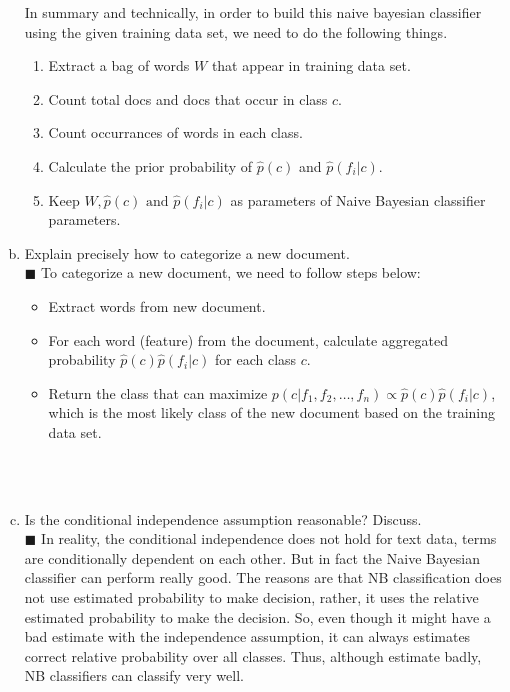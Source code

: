 \documentclass{article}
\newcommand{\solution}[1]{~\\ $\blacksquare$ \sffamily\upshape\selectfont #1
\normalfont ~\\~ }
\begin{document}
\begin{enumerate}[a.]
{    In summary and technically, in order to build this naive bayesian
    classifier using the given training data set, we need to do the
    following things.  \\ 
    \begin{enumerate}
    \item Extract a bag of words $W$ that appear in training data set. 
    \item Count total docs and docs that occur in class $c$. 
    \item Count occurrances of words in each class. 
    \item Calculate the prior probability of $\hat{p}(c)$ and
      $\hat{p}(f_i|c)$. 
    \item Keep $W, \hat{p}(c) \mbox{ and } \hat{p}(f_i|c)$ as
      parameters of Naive Bayesian classifier parameters. 
     \end{enumerate}
  }
\item Explain precisely how to categorize a new document. 
  \solution{To categorize a new document, we need to follow steps
    below: \\ 
  \begin{itemize}
    \item Extract words from new document. 
    \item For each word (feature) from the document, calculate
      aggregated probability $\hat{p}(c)\hat{p}(f_i|c)$ for each class
      $c$. 
    \item Return the class that can maximize $p(c|f_1,f_2,\ldots,f_n)
      \propto \hat{p}(c)\hat{p}(f_i|c)$, which is the most likely class of
      the new document based on the training data set. 
  \end{itemize}
}
\item Is the conditional independence assumption reasonable? Discuss. 
  \solution{In reality, the conditional independence does not hold for text
  data, terms are conditionally dependent on each other. But in fact
  the Naive Bayesian classifier can perform really good. The reasons
  are that NB classification does not use estimated probability to
  make decision, rather, it uses the relative estimated probability to
  make the decision. So, even though it might have a bad estimate with the
  independence assumption, it can always estimates correct relative
  probability over all classes. Thus, although estimate badly, NB
  classifiers can classify very well. }
\end{enumerate}
\end{document}
